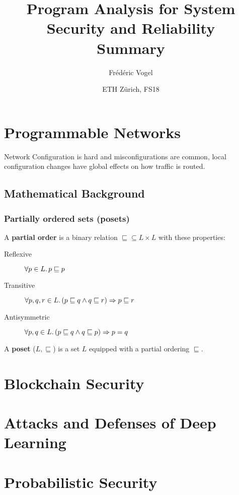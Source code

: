 \documentclass[10pt,a4paper]{article}
\title{Program Analysis for System Security and Reliability\\Summary}
\author{Frédéric Vogel}
\date{ETH Zürich, FS18}
\begin{document}
\maketitle

\tableofcontents

\pagebreak

\section{Programmable Networks}
Network Configuration is hard and misconfigurations are common, local configuration changes have global effects on how traffic is routed.
\subsection{Mathematical Background}
\subsubsection{Partially ordered sets (posets)}
A \textbf{partial order} is a binary relation $\sqsubseteq \subseteq L\times L$ with these properties:
\begin{description}
	\item[Reflexive] $\forall p \in L\ldotp p\sqsubseteq p$
	\item[Transitive] $\forall p, q, r \in L\ldotp (p\sqsubseteq q \wedge q\sqsubseteq r) \Rightarrow p \sqsubseteq r$
	\item[Antisymmetric] $\forall p, q \in L\ldotp (p\sqsubseteq q\wedge q\sqsubseteq p) \Rightarrow p=q$
\end{description}

A \textbf{poset} ($L, \sqsubseteq$) is a set $L$ equipped with a partial ordering $\sqsubseteq$.



\section{Blockchain Security}

\section{Attacks and Defenses of Deep Learning}

\section{Probabilistic Security}
\end{document}
